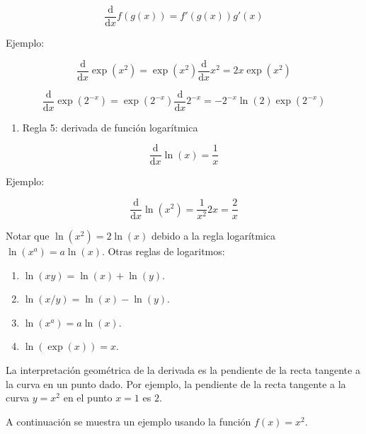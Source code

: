 \documentclass[11pt]{article}
\providecommand{\tightlist}{%
      \setlength{\itemsep}{0pt}\setlength{\parskip}{0pt}}
\begin{document}
\[\frac{\text{d}}{\text{d}x} f(g(x)) = f'(g(x)) g'(x)\]

Ejemplo:

\[\frac{\text{d}}{\text{d}x} \exp(x^2) = \exp(x^2) \frac{\text{d}}{\text{d}x} x^2 = 2x \exp(x^2)\]

\[\frac{\text{d}}{\text{d}x} \exp(2^{-x}) = \exp(2^{-x}) \frac{\text{d}}{\text{d}x} 2^{-x} = -2^{-x} \ln(2) \exp(2^{-x})\]

\begin{enumerate}
\def\labelenumi{\arabic{enumi}.}
\setcounter{enumi}{4}
\tightlist
\item
  Regla 5: derivada de función logarítmica
\end{enumerate}

\[\frac{\text{d}}{\text{d}x} \ln(x) = \frac{1}{x}\]

Ejemplo:

\[\frac{\text{d}}{\text{d}x} \ln(x^2) = \frac{1}{x^2} 2x = \frac{2}{x}\]

Notar que \(\ln(x^2) = 2 \ln(x)\) debido a la regla logarítmica
\(\ln(x^a) = a \ln(x)\). Otras reglas de logaritmos:

\begin{enumerate}
\def\labelenumi{\arabic{enumi}.}
\tightlist
\item
  \(\ln(xy) = \ln(x) + \ln(y)\).
\item
  \(\ln(x/y) = \ln(x) - \ln(y)\).
\item
  \(\ln(x^a) = a \ln(x)\).
\item
  \(\ln(\exp(x)) = x\).
\end{enumerate}

    La interpretación geométrica de la derivada es la pendiente de la recta
tangente a la curva en un punto dado. Por ejemplo, la pendiente de la
recta tangente a la curva \(y = x^2\) en el punto \(x=1\) es \(2\).

A continuación se muestra un ejemplo usando la función \(f(x) = x^2\).
\end{document}
